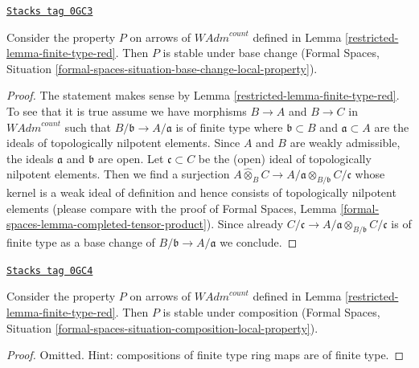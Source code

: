 \begin{lemma}
\label{restricted-lemma-base-change-finite-type-red}
\href{https://stacks.math.columbia.edu/tag/0GC3}{\texttt{Stacks tag 0GC3}}

Consider the property $P$ on arrows of $\textit{WAdm}^{count}$ defined in
Lemma \ref{restricted-lemma-finite-type-red}. Then $P$ is stable under base change
(Formal Spaces, Situation
\ref{formal-spaces-situation-base-change-local-property}).
\end{lemma}

\begin{proof}

The statement makes sense by Lemma \ref{restricted-lemma-finite-type-red}.
To see that it is true assume we have morphisms $B \to A$ and $B \to C$
in $\textit{WAdm}^{count}$ such that $B/\mathfrak b \to A/\mathfrak a$
is of finite type where $\mathfrak b \subset B$ and $\mathfrak a \subset A$
are the ideals of topologically nilpotent elements.
Since $A$ and $B$ are weakly admissible, the ideals
$\mathfrak a$ and $\mathfrak b$ are open.
Let $\mathfrak c \subset C$ be the (open) ideal
of topologically nilpotent elements. Then we find a surjection
$A \widehat{\otimes}_B C \to
A/\mathfrak a \otimes_{B/\mathfrak b} C/\mathfrak c$
whose kernel is a weak ideal of definition and hence consists
of topologically nilpotent elements
(please compare with the proof of Formal Spaces,
Lemma \ref{formal-spaces-lemma-completed-tensor-product}). Since already
$C/\mathfrak c \to A/\mathfrak a \otimes_{B/\mathfrak b} C/\mathfrak c$
is of finite type as a base change of $B/\mathfrak b \to A/\mathfrak a$
we conclude.
\end{proof}

\begin{lemma}
\label{restricted-lemma-composition-finite-type-red}
\href{https://stacks.math.columbia.edu/tag/0GC4}{\texttt{Stacks tag 0GC4}}

Consider the property $P$ on arrows of $\textit{WAdm}^{count}$ defined in
Lemma \ref{restricted-lemma-finite-type-red}. Then $P$ is stable under composition
(Formal Spaces, Situation
\ref{formal-spaces-situation-composition-local-property}).
\end{lemma}

\begin{proof}
Omitted. Hint: compositions of finite type ring maps are of finite type.
\end{proof}

